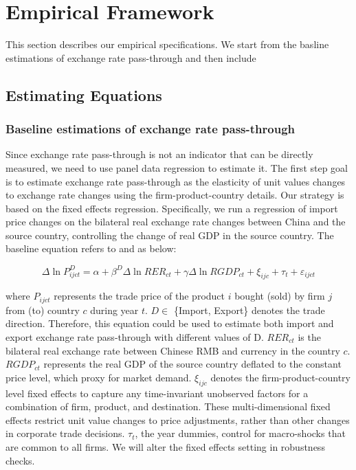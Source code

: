 \documentclass[12pt]{article}
\begin{document}
\section{Empirical Framework} \label{Framework}
This section describes our empirical specifications. We start from the basline estimations of exchange rate pass-through and then include 

\subsection{Estimating Equations} \label{Framework-Equations}

\subsubsection{Baseline estimations of exchange rate pass-through}

Since exchange rate pass-through is not an indicator that can be directly measured, we need to use panel data regression to estimate it. The first step goal is to estimate exchange rate pass-through as the elasticity of unit values changes to exchange rate changes using the firm-product-country details. Our strategy is based on the fixed effects regression. Specifically, we run a regression of import price changes on the bilateral real exchange rate changes between China and the source country, controlling the change of real GDP in the source country. The baseline equation refers to \cite{aik2014} and \cite{lmx2015} as below:

\begin{equation}
	\Delta \ln P^{D}_{i j c t}=\alpha+\beta^D \Delta \ln R E R_{c t}+\gamma \Delta \ln R G D P_{c t}+\xi_{i j c}+\tau_{t}+\varepsilon_{i j c t}
	\label{eq.baseline}
\end{equation}

where $P_{ijct}$ represents the trade price of the product $i$ bought (sold) by firm $j$ from (to) country $c$ during year $t$.  $D \in$ \{Import, Export\} denotes the trade direction. Therefore, this equation could be used to estimate both import and export exchange rate pass-through with different values of D. $R E R_{c t}$ is the bilateral real exchange rate between Chinese RMB and currency in the country $c$. $RGDP_{ct}$ represents the real GDP of the source country deflated to the constant price level, which proxy for market demand. $\xi_{ijc}$ denotes the firm-product-country level fixed effects to capture any time-invariant unobserved factors for a combination of firm, product, and destination. These multi-dimensional fixed effects restrict unit value changes to price adjustments, rather than other changes in corporate trade decisions. $\tau_t$, the year dummies, control for macro-shocks that are common to all firms. We will alter the fixed effects setting in robustness checks.
\end{document}
